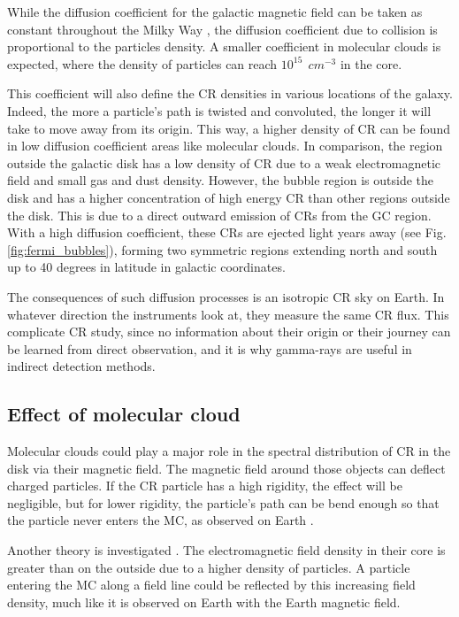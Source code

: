 While the diffusion coefficient for the galactic magnetic field can be taken as constant throughout the Milky Way \cite{Farrar2012}, the diffusion coefficient due to collision is proportional to the particles density. A smaller coefficient in molecular clouds is expected, where the density of particles can reach $10^{15}\ \ cm^{-3}$ in the core. \cite{Blitz2000}

This coefficient will also define the CR densities in various locations of the galaxy. Indeed, the more a particle's path is twisted and convoluted, the longer it will take to move away from its origin. This way, a higher density of CR can be found in low diffusion coefficient areas like molecular clouds. In comparison, the region outside the galactic disk has a low density of CR due to a weak electromagnetic field and small gas and dust density.
However, the bubble region is outside the disk and has a higher concentration of high energy CR than other regions outside the disk. This is due to a direct outward emission of CRs from the GC region. With a high diffusion coefficient, these CRs are ejected light years away (see Fig. \ref{fig:fermi_bubbles}), forming two symmetric regions extending north and south up to 40 degrees in latitude in galactic coordinates.\cite{Ackermann2014}

The consequences of such diffusion processes is an isotropic CR sky on Earth. In whatever direction the instruments look at, they measure the same CR flux. This complicate CR study, since no information about their origin or their journey can be learned from direct observation, and it is why gamma-rays are useful in indirect detection methods.


\subsection{Effect of molecular cloud}

Molecular clouds could play a major role in the spectral distribution of CR in the disk via their magnetic field. 
The magnetic field around those objects can deflect charged particles. If the CR particle has a high rigidity, the effect will be negligible, but for lower rigidity, the particle's path can be bend enough so that the particle never enters the MC, as observed on Earth \cite{Stormer1930}.

Another theory is investigated \cite{Ivlev2018}. The electromagnetic field density in their core is greater than on the outside due to a higher density of particles. A particle entering the MC along a field line could be reflected by this increasing field density, much like it is observed on Earth with the Earth magnetic field.

